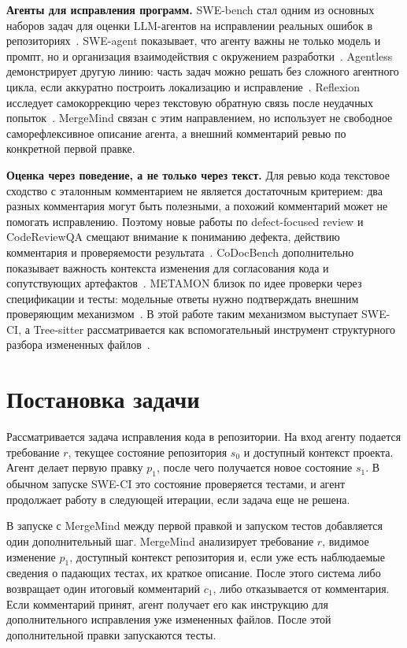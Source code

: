 \documentclass[12pt,a4paper]{article}
\begin{document}
\textbf{Агенты для исправления программ.}
SWE-bench стал одним из основных наборов задач для оценки LLM-агентов на
исправлении реальных ошибок в репозиториях~\cite{swebench}. SWE-agent
показывает, что агенту важны не только модель и промпт, но и организация
взаимодействия с окружением разработки~\cite{sweagent}. Agentless демонстрирует
другую линию: часть задач можно решать без сложного агентного цикла, если
аккуратно построить локализацию и исправление~\cite{agentless}. Reflexion
исследует самокоррекцию через текстовую обратную связь после неудачных
попыток~\cite{reflexion}. MergeMind связан с этим направлением, но использует
не свободное саморефлексивное описание агента, а внешний комментарий ревью по
конкретной первой правке.

\textbf{Оценка через поведение, а не только через текст.}
Для ревью кода текстовое сходство с эталонным комментарием не является
достаточным критерием: два разных комментария могут быть полезными, а похожий
комментарий может не помогать исправлению. Поэтому новые работы по
defect-focused review и CodeReviewQA смещают внимание к пониманию дефекта,
действию комментария и проверяемости результата~\cite{defectfocused,codereviewqa}.
CoDocBench дополнительно показывает важность контекста изменения для согласования
кода и сопутствующих артефактов~\cite{codocbench}. METAMON близок по идее
проверки через спецификации и тесты: модельные ответы нужно подтверждать
внешним проверяющим механизмом~\cite{metamon}. В этой работе таким механизмом
выступает SWE-CI, а Tree-sitter рассматривается как вспомогательный инструмент
структурного разбора измененных файлов~\cite{treesitter}.

\section{Постановка задачи}

Рассматривается задача исправления кода в репозитории. На вход агенту подается
требование \(r\), текущее состояние репозитория \(s_0\) и доступный контекст
проекта. Агент делает первую правку \(p_1\), после чего получается новое
состояние \(s_1\). В обычном запуске SWE-CI это состояние проверяется тестами,
и агент продолжает работу в следующей итерации, если задача еще не решена.

В запуске с MergeMind между первой правкой и запуском тестов добавляется один
дополнительный шаг. MergeMind анализирует требование \(r\), видимое изменение
\(p_1\), доступный контекст репозитория и, если уже есть наблюдаемые сведения о
падающих тестах, их краткое описание. После этого система либо возвращает один
итоговый комментарий \(c_1\), либо отказывается от комментария. Если комментарий
принят, агент получает его как инструкцию для дополнительного исправления уже
измененных файлов. После этой дополнительной правки запускаются тесты.
\end{document}
